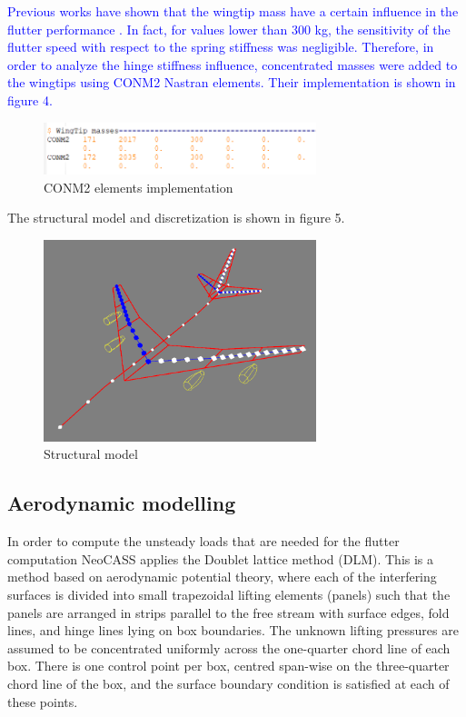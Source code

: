 \documentclass[conference]{IEEEtran}
\newlength\figureheight
\newlength\figurewidth
\begin{document}
\textcolor{blue}{Previous works have shown that the wingtip mass have a certain influence in the flutter performance \cite{Castrichini2016}. In fact, for values lower than 300 kg, the sensitivity of the flutter speed with respect to the spring stiffness was negligible. Therefore, in order to analyze the hinge stiffness influence, concentrated masses were added to the wingtips using CONM2 Nastran elements. Their implementation is shown in figure 4.}

\begin{figure}[htp]
  \centering
  \setlength\figureheight{5cm}
  \setlength\figurewidth{7cm}
  \includegraphics[width=225pt]{images/NastranCONM2.png}
  \caption{CONM2 elements implementation}
  \label{fig:my-figure}
\end{figure}

The structural model and discretization is shown in figure 5.

\begin{figure}[htp]
  \centering
  \setlength\figureheight{5cm}
  \setlength\figurewidth{7cm}
  \includegraphics[width=225pt]{images/StructuralModel.png}
  \caption{Structural model}
  \label{fig:my-figure}
\end{figure}

\subsection{Aerodynamic modelling}
In order to compute the unsteady loads that are needed for the flutter computation NeoCASS applies the Doublet lattice method (DLM). This is a method based on aerodynamic potential theory, where each of the interfering surfaces is divided into small trapezoidal lifting elements (panels) such that the panels are arranged in strips parallel to the free stream with surface edges, fold lines, and hinge lines lying on box boundaries. The unknown lifting pressures are assumed to be concentrated uniformly across the one-quarter chord line of each box. There is one control point per box, centred span-wise on the three-quarter chord line of the box, and the surface boundary condition is satisfied at each of these points.
\end{document}
